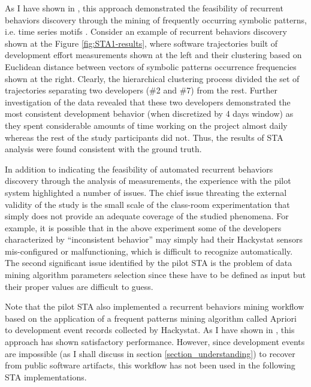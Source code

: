 As I have shown in \cite{csdl2-10-09}, this approach demonstrated the feasibility of recurrent behaviors discovery 
through the mining of frequently occurring symbolic patterns, i.e. time series motifs \cite{sax}. 
Consider an example of recurrent behaviors discovery shown at the Figure \ref{fig:STA1-results}, where software 
trajectories built of development effort measurements shown at the left and their clustering based on Euclidean 
distance between vectors of symbolic patterns occurrence frequencies shown at the right. Clearly, the hierarchical clustering 
process divided the set of trajectories separating two developers (\#2 and \#7) from the rest. 
Further investigation of the data revealed that these two developers demonstrated the most consistent development 
behavior (when discretized by 4 days window) as they spent considerable amounts of time working on the project almost daily
whereas the rest of the study participants did not. 
Thus, the results of STA analysis were found consistent with the ground truth.

In addition to indicating the feasibility of automated recurrent behaviors discovery through the analysis of measurements, 
the experience with the pilot system highlighted a number of issues.
The chief issue threating the external validity of the study is the small scale of the class-room experimentation that
simply does not provide an adequate coverage of the studied phenomena. 
For example, it is possible that in the above experiment some of the developers characterized by ``inconsistent 
behavior'' may simply had their Hackystat sensors mis-configured or malfunctioning, which is difficult to recognize automatically.
The second significant issue identified by the pilot STA is the problem of data mining algorithm parameters 
selection since these have to be defined as input but their proper values are difficult to guess.

Note that the pilot STA also implemented a recurrent behaviors mining workflow based on the application of 
a frequent patterns mining algorithm called Apriori \cite{citeulike:775528} to development event records collected by Hackystat. 
As I have shown in \cite{citeulike:13159603}, this approach has shown satisfactory performance. 
However, since development events are impossible (as I shall discuss in section \ref{section_understanding}) to recover from 
public software artifacts, this workflow has not been used in the following STA implementations.

